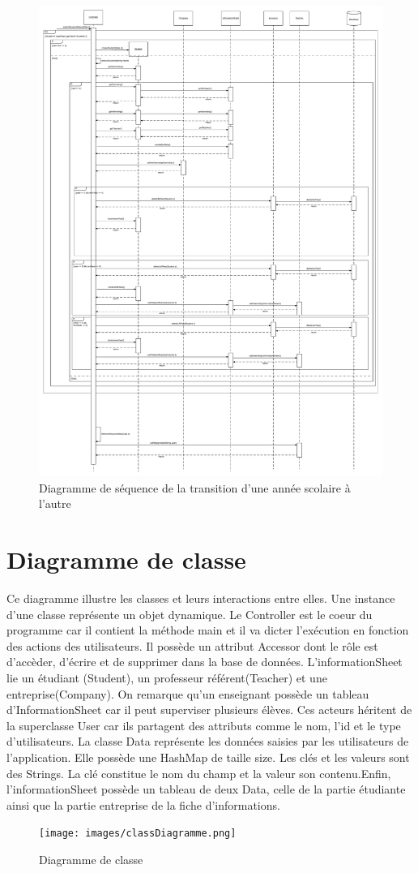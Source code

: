\documentclass{scrreprt}
\begin{document}
\newpage
\begin{figure}[h]
\centering
\includegraphics[width=15cm]{images/newYearSeqDiag.png}
\caption{Diagramme de séquence de la transition d'une année scolaire à l'autre}
\end{figure}

\newpage
\chapter{Diagramme de classe}

Ce diagramme illustre les classes et leurs interactions entre elles. Une instance d'une classe représente un objet dynamique. Le Controller est le coeur du programme car il contient la méthode main et il va dicter l'exécution en fonction des actions des utilisateurs. Il possède un attribut Accessor dont le rôle est d'accèder, d'écrire et de supprimer dans la base de données. L'informationSheet lie un étudiant (Student), un professeur référent(Teacher) et une entreprise(Company). On remarque qu'un enseignant possède un tableau d'InformationSheet car il peut superviser plusieurs élèves. Ces acteurs héritent de la superclasse User car ils partagent des attributs comme le nom, l'id et le type d'utilisateurs. La classe Data représente les données saisies par les utilisateurs de l'application. Elle possède une HashMap de taille size. Les clés et les valeurs sont des Strings. La clé constitue le nom du champ et la valeur son contenu.Enfin, l'informationSheet possède un tableau de deux Data, celle de la partie étudiante ainsi que la partie entreprise de la fiche d'informations.

\begin{figure}[!h]
\centering
\texttt{[image: images/classDiagramme.png]}
\caption{Diagramme de classe}
\end{figure}
\end{document}
